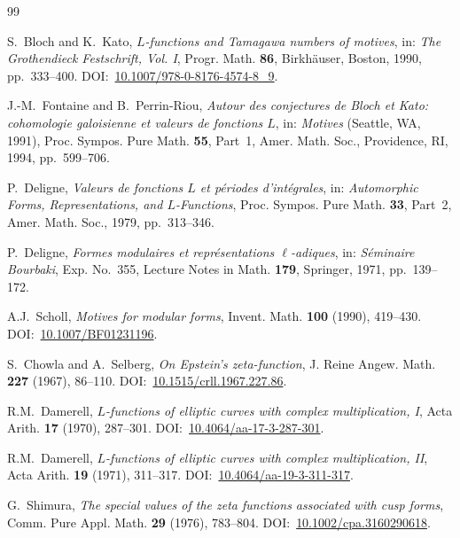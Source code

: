 \documentclass[12pt]{amsart}
\theoremstyle{definition}
\begin{document}
\begin{thebibliography}{99}

S.~Bloch and K.~Kato,
\emph{$L$-functions and Tamagawa numbers of motives},
in: \emph{The Grothendieck Festschrift, Vol. I},
Progr. Math. \textbf{86}, Birkhäuser, Boston, 1990, pp.~333--400.
DOI:~\href{https://doi.org/10.1007/978-0-8176-4574-8_9}{10.1007/978-0-8176-4574-8\_9}.

J.-M.~Fontaine and B.~Perrin-Riou,
\emph{Autour des conjectures de Bloch et Kato: cohomologie galoisienne
et valeurs de fonctions $L$},
in: \emph{Motives} (Seattle, WA, 1991),
Proc. Sympos. Pure Math. \textbf{55}, Part~1,
Amer. Math. Soc., Providence, RI, 1994, pp.~599--706.

P.~Deligne,
\emph{Valeurs de fonctions $L$ et périodes d'intégrales},
in: \emph{Automorphic Forms, Representations, and $L$-Functions},
Proc. Sympos. Pure Math. \textbf{33}, Part~2,
Amer. Math. Soc., 1979, pp.~313--346.

P.~Deligne,
\emph{Formes modulaires et représentations $\ell$-adiques},
in: \emph{Séminaire Bourbaki}, Exp. No.~355,
Lecture Notes in Math. \textbf{179}, Springer, 1971, pp.~139--172.

A.J.~Scholl,
\emph{Motives for modular forms},
Invent. Math. \textbf{100} (1990), 419--430.
DOI:~\href{https://doi.org/10.1007/BF01231196}{10.1007/BF01231196}.

S.~Chowla and A.~Selberg,
\emph{On Epstein's zeta-function},
J. Reine Angew. Math. \textbf{227} (1967), 86--110.
DOI:~\href{https://doi.org/10.1515/crll.1967.227.86}{10.1515/crll.1967.227.86}.

R.M.~Damerell,
\emph{$L$-functions of elliptic curves with complex multiplication, I},
Acta Arith. \textbf{17} (1970), 287--301.
DOI:~\href{https://doi.org/10.4064/aa-17-3-287-301}{10.4064/aa-17-3-287-301}.

R.M.~Damerell,
\emph{$L$-functions of elliptic curves with complex multiplication, II},
Acta Arith. \textbf{19} (1971), 311--317.
DOI:~\href{https://doi.org/10.4064/aa-19-3-311-317}{10.4064/aa-19-3-311-317}.

G.~Shimura,
\emph{The special values of the zeta functions associated with cusp forms},
Comm. Pure Appl. Math. \textbf{29} (1976), 783--804.
DOI:~\href{https://doi.org/10.1002/cpa.3160290618}{10.1002/cpa.3160290618}.


\end{thebibliography}
\end{document}

